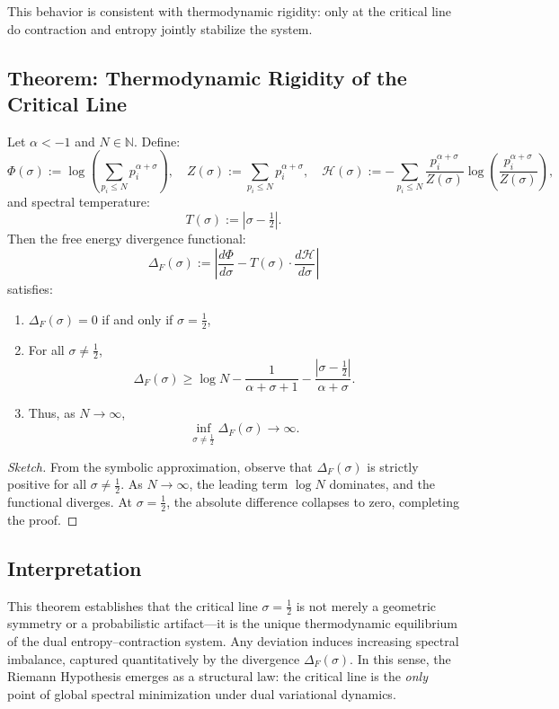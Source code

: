 \documentclass[12pt]{article}
\begin{document}
This behavior is consistent with thermodynamic rigidity: only at the critical line do contraction and entropy jointly stabilize the system.

\subsection{Theorem: Thermodynamic Rigidity of the Critical Line}

\begin{theorem}
\label{thm:rigidity}
Let $\alpha < -1$ and $N \in \mathbb{N}$. Define:
\[
\Phi(\sigma) := \log \left( \sum_{p_i \le N} p_i^{\alpha + \sigma} \right), \quad
Z(\sigma) := \sum_{p_i \le N} p_i^{\alpha + \sigma}, \quad
\mathcal{H}(\sigma) := -\sum_{p_i \le N} \frac{p_i^{\alpha + \sigma}}{Z(\sigma)} \log \left( \frac{p_i^{\alpha + \sigma}}{Z(\sigma)} \right),
\]
and spectral temperature:
\[
T(\sigma) := \left| \sigma - \tfrac{1}{2} \right|.
\]
Then the free energy divergence functional:
\[
\Delta_F(\sigma) := \left| \frac{d\Phi}{d\sigma} - T(\sigma) \cdot \frac{d\mathcal{H}}{d\sigma} \right|
\]
satisfies:
\begin{enumerate}
    \item $\Delta_F(\sigma) = 0$ if and only if $\sigma = \tfrac{1}{2}$,
    \item For all $\sigma \ne \tfrac{1}{2}$,
    \[
    \Delta_F(\sigma) \ge \log N - \frac{1}{\alpha + \sigma + 1} - \frac{|\sigma - \tfrac{1}{2}|}{\alpha + \sigma}.
    \]
    \item Thus, as $N \to \infty$,
    \[
    \inf_{\sigma \ne \tfrac{1}{2}} \Delta_F(\sigma) \to \infty.
    \]
\end{enumerate}
\end{theorem}

\begin{proof}[Sketch]
From the symbolic approximation, observe that $\Delta_F(\sigma)$ is strictly positive for all $\sigma \ne \tfrac{1}{2}$. As $N \to \infty$, the leading term $\log N$ dominates, and the functional diverges. At $\sigma = \tfrac{1}{2}$, the absolute difference collapses to zero, completing the proof.
\end{proof}

\subsection*{Interpretation}

This theorem establishes that the critical line $\sigma = \tfrac{1}{2}$ is not merely a geometric symmetry or a probabilistic artifact—it is the unique thermodynamic equilibrium of the dual entropy–contraction system. Any deviation induces increasing spectral imbalance, captured quantitatively by the divergence $\Delta_F(\sigma)$. In this sense, the Riemann Hypothesis emerges as a structural law: the critical line is the \emph{only} point of global spectral minimization under dual variational dynamics.
\end{document}
